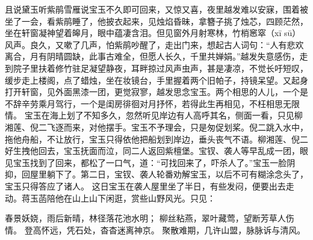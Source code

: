 \documentclass[12pt,oneside]{book}
\begin{document}
且说黛玉听紫鹃雪雁说宝玉不久即可回来，又惊又喜，夜里越发难以安寐，围着被坐了一会，看紫鹃睡了，他披衣起来，见烛焰昏昧，拿簪子挑了烛芯，四顾茫然，坐在轩窗凝神望着皞月，眼中蕴凄含泪。但见窗外月射寒林，竹梢窸窣（xī sū）风声。良久，又嗽了几声，怕紫鹃吵醒了，走出门来，想起古人词句：“人有悲欢离合，月有阴晴圆缺，此事古难全，但愿人长久，千里共婵娟。”越发失意感伤，走到院子里扶着修竹驻足凝望静夜，耳畔掠过风声虫声，甚是凄凉，不觉长吁短叹，缓步走上楼阁，点了蜡烛，坐在妆镜台，手里握着两个旧帕子，持镜呆望。又起身打开轩窗，见外面黑漆一团，更觉寂寥，越发思念宝玉。两个相思的人儿，一个是不辞辛劳乘月驾行，一个是闺房徘徊对月抒怀，若得此生再相见，不枉相思无限情。
宝玉在海上划了不知多久，忽然听见岸边有人高呼其名，侧面一看，只见柳湘莲、倪二飞逐而来，对他摆手。宝玉不予理会，只是匆促划桨。倪二跳入水中，拖他舟船，不让放行，宝玉只得依他把船划到岸边，垂头丧气不语。柳湘莲、倪二好生拽他回去，宝玉抚面而泣，同二人返回紫檀堡。宝钗、袭人等早乱成一团，眼见宝玉找到了回来，都松了一口气，道：“可找回来了，吓杀人了。”宝玉一脸阴抑，回屋里躺下了。第二日，宝钗、袭人轮番劝解宝玉，以后不可有糊涂念头了，宝玉只得答应了诸人。
这日宝玉在袭人屋里坐了半日，有些发闷，便要出去走动。蒋玉菡陪他在山上山下闲逛，赏些山野风光。只见：

春景妖娆，雨后新晴，林径落花池水明；
柳丝粘燕，翠叶藏莺，望断芳草人伤情。
登高怀远，凭石处，杳杳迷离神京。
聚散难期，几许山盟，脉脉诉与清风。
\end{document}
